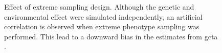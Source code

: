 	\begin{figure}[t]
		\centering
		\caption[Effect of Extreme Sampling Design]
		{Effect of extreme sampling design.
			Although the genetic and environmental effect were simulated independently, an artificial correlation is observed when extreme phenotype sampling was performed. 
			This lead to a downward bias in the estimates from \gls{gcta} \citep{Golan2014}.
		} 
		\label{fig:extremeSampling}
	\end{figure}
	

